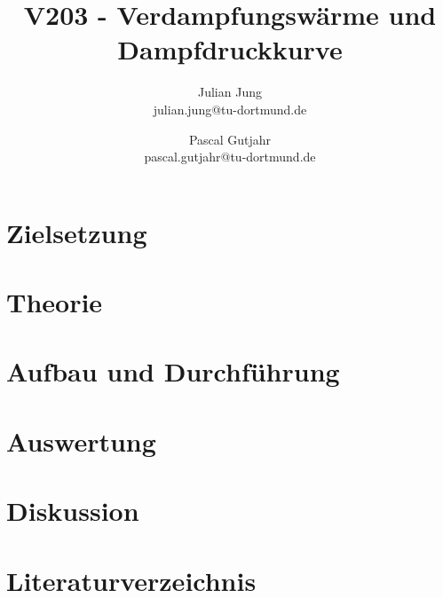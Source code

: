 


\title{V203 - Verdampfungswärme und Dampfdruckkurve}
\author{Julian Jung \\ julian.jung@tu-dortmund.de
  \and Pascal Gutjahr \\ pascal.gutjahr@tu-dortmund.de}
\maketitle
\newpage
\tableofcontents
\newpage
\section{Zielsetzung}
\section{Theorie}
\section{Aufbau und Durchführung}
\section{Auswertung}
\section{Diskussion}
\section{Literaturverzeichnis}

